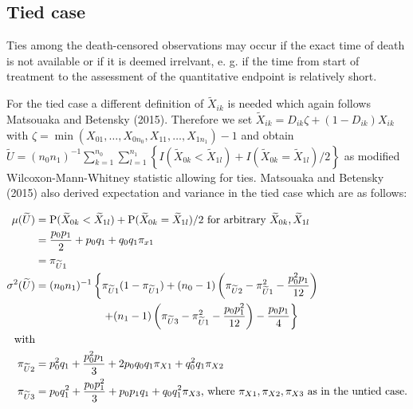 \documentclass[bimj,fleqn]{w-art}\usepackage[]{graphicx}\usepackage[]{color}
\theoremstyle{plain}
\theoremstyle{definition}
\begin{document}
  \subsection{Tied case}
  \label{sec:PowerTied}
  Ties among the death-censored observations may occur if the exact time of
  death is not available or if it is deemed irrelvant, e. g. if the time from
  start of treatment to the assessment of the quantitative endpoint is
  relatively short.

  For the tied case a different definition of $\widetilde{X}_{ik}$ is needed
  which again follows Matsouaka and Betensky (2015). Therefore we set
  $\widetilde{X}_{ik} = D_{ik}\zeta   + (1 - D_{ik})X_{ik}$ with
	$\zeta = \min(X_{01}, \ldots, X_{0n_0}, X_{11}, \ldots, X_{1n_1}) - 1$ and
	obtain
	$ \widetilde{U} =(n_0 n_1)^{-1}\sum_{k=1}^{n_0}
	  \sum_{l=1}^{n_1}\left\{I(\widetilde{X}_{0k} < \widetilde{X}_{1l})
	  + I(\widetilde{X}_{0k} = \widetilde{X}_{1l}) / 2 \right\} $
  as modified Wilcoxon-Mann-Whitney statistic allowing for ties. Matsouaka and
  Betensky (2015) also derived expectation and variance in the tied case which
  are as follows:

  \begin{align*}
    \mu(\widetilde{U}) &= \text{P}(\widetilde{X}_{0k} < \widetilde{X}_{1l})
                          + \text{P}(\widetilde{X}_{0k} = \widetilde{X}_{1l}) / 2
                          \mbox{ for arbitrary }
                           \widetilde{X}_{0k}, \widetilde{X}_{1l} \\
                       &= \frac{p_0 p_1}{2}  + p_0 q_1 + q_0 q_1 \pi_{x1} \\
                       &= \pi_{\widetilde{U}1} \\
    \sigma^2(\widetilde{U}) &= (n_0 n_1)^{-1}
                               \left\{ \pi_{\widetilde{U}1} (1 - \pi_{\widetilde{U}1}) +
                               (n_0 - 1) \left(\pi_{\widetilde{U}2} - \pi_{\widetilde{U}1}^2  - \frac{p^2_0 p_1}{12} \right)
                               \right.\\
                            &\hphantom{(n_0 n_1)^{-1} left\{ }
                            \left.
                              + (n_1 - 1) \left(\pi_{\widetilde{U}3} - \pi_{\widetilde{U}1}^2  - \frac{p_0 p^2_1}{12}\right)
                              - \frac{p_0 p_1}{4}\right\} \\
    \mbox{with} \\
    \pi_{\widetilde{U}2} &= p^2_0 q_1 + \frac{p^2_0 p_1}{3} + 2 p_0 q_0 q_1 \pi_{X1} + q^2_0 q_1 \pi_{X2} \\
    \pi_{\widetilde{U}3} &= p_0 q^2_1 + \frac{p_0 p^2_1}{3} + p_0 p_1 q_1 + q_0 q^2_1 \pi_{X3}
                            \mbox{, where } \pi_{X1}, \pi_{X2}, \pi_{X3} \mbox{ as in the untied case.}
  \end{align*}
\end{document}
